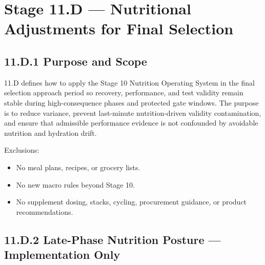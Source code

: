 \documentclass[10pt]{article}
\begin{document}
\section*{Stage 11.D — Nutritional Adjustments for Final Selection}
{}

\subsection*{11.D.1 Purpose and Scope}
{}

11.D defines how to apply the Stage 10 Nutrition Operating System in the final selection approach period so recovery, performance, and test validity remain stable during high-consequence phases and protected gate windows. The purpose is to reduce variance, prevent last-minute nutrition-driven validity contamination, and ensure that admissible performance evidence is not confounded by avoidable nutrition and hydration drift.

Exclusions:

\begin{itemize}
\item No meal plans, recipes, or grocery lists.
\item No new macro rules beyond Stage 10.
\item No supplement dosing, stacks, cycling, procurement guidance, or product recommendations.
\end{itemize}

\newpage

\subsection*{11.D.2 Late-Phase Nutrition Posture — Implementation Only}
{}
\end{document}
